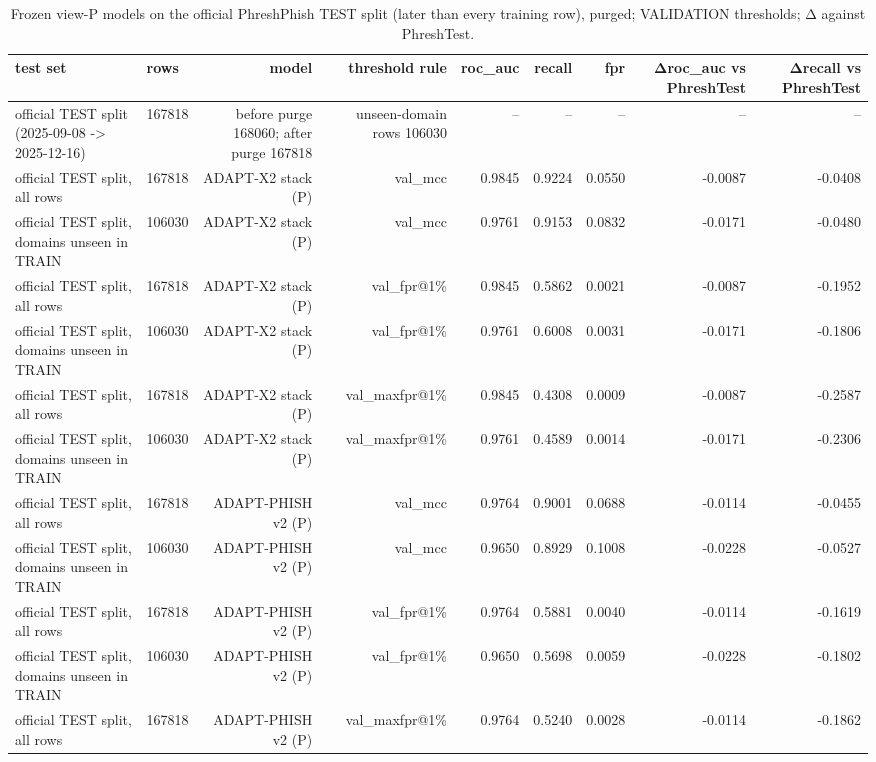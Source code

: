 \begin{table}[t]
\centering
\scriptsize
\caption{Frozen view-P models on the official PhreshPhish TEST split (later than every training row), purged; VALIDATION thresholds; Δ against PhreshTest.}
\label{tab:rev_R22_official_phreshphish_test_split}
\begin{tabular}{llrrrrrrr}
\toprule
test set & rows & model & threshold rule & roc\_auc & recall & fpr & Δroc\_auc vs PhreshTest & Δrecall vs PhreshTest \\
\midrule
official TEST split (2025-09-08 -> 2025-12-16) & 167818 & before purge 168060; after purge 167818 & unseen-domain rows 106030 & -- & -- & -- & -- & -- \\
official TEST split, all rows & 167818 & ADAPT-X2 stack (P) & val\_mcc & 0.9845 & 0.9224 & 0.0550 & -0.0087 & -0.0408 \\
official TEST split, domains unseen in TRAIN & 106030 & ADAPT-X2 stack (P) & val\_mcc & 0.9761 & 0.9153 & 0.0832 & -0.0171 & -0.0480 \\
official TEST split, all rows & 167818 & ADAPT-X2 stack (P) & val\_fpr@1\% & 0.9845 & 0.5862 & 0.0021 & -0.0087 & -0.1952 \\
official TEST split, domains unseen in TRAIN & 106030 & ADAPT-X2 stack (P) & val\_fpr@1\% & 0.9761 & 0.6008 & 0.0031 & -0.0171 & -0.1806 \\
official TEST split, all rows & 167818 & ADAPT-X2 stack (P) & val\_maxfpr@1\% & 0.9845 & 0.4308 & 0.0009 & -0.0087 & -0.2587 \\
official TEST split, domains unseen in TRAIN & 106030 & ADAPT-X2 stack (P) & val\_maxfpr@1\% & 0.9761 & 0.4589 & 0.0014 & -0.0171 & -0.2306 \\
official TEST split, all rows & 167818 & ADAPT-PHISH v2 (P) & val\_mcc & 0.9764 & 0.9001 & 0.0688 & -0.0114 & -0.0455 \\
official TEST split, domains unseen in TRAIN & 106030 & ADAPT-PHISH v2 (P) & val\_mcc & 0.9650 & 0.8929 & 0.1008 & -0.0228 & -0.0527 \\
official TEST split, all rows & 167818 & ADAPT-PHISH v2 (P) & val\_fpr@1\% & 0.9764 & 0.5881 & 0.0040 & -0.0114 & -0.1619 \\
official TEST split, domains unseen in TRAIN & 106030 & ADAPT-PHISH v2 (P) & val\_fpr@1\% & 0.9650 & 0.5698 & 0.0059 & -0.0228 & -0.1802 \\
official TEST split, all rows & 167818 & ADAPT-PHISH v2 (P) & val\_maxfpr@1\% & 0.9764 & 0.5240 & 0.0028 & -0.0114 & -0.1862 \\

\end{tabular}
\end{table}
